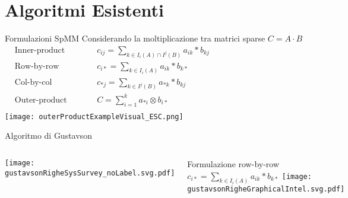 \section{Algoritmi Esistenti}
\begin{frame} {Formulazioni SpMM}
Considerando la moltiplicazione tra matrici sparse $C = A\cdot B$
\voidLine
\centering
$
\begin{aligned}
  &\text{Inner-product}	&& \qquad c_{ij} = \sum\limits_{k \in I_i(A) \cap I^j(B) }  a_{ik} \ast  b_{kj}   \\
  &\text{Row-by-row}	&& \qquad c_{i*} = \sum\limits_{k \in I_i(A)}  a_{ik} \ast  b_{k*}  \\
  &\text{Col-by-col}	&& \qquad c_{*j} = \sum\limits_{k \in I^j(B)}  a_{*k} \ast  b_{kj}   \\
  &\text{Outer-product}	&& \qquad C = \sum\limits_{i=1}^k  a_{*i} \otimes  b_{i*}                \\
\end{aligned}
$\\
\texttt{[image: outerProductExampleVisual\_ESC.png]}

\end{frame}

\begin{frame} {Algoritmo di Gustavson}
\begin{columns}
	\texttt{[image: gustavsonRigheSysSurvey\_noLabel.svg.pdf]}
	
  	Formulazione row-by-row $c_{i*} = \sum\limits_{k \in I_i(A)}  a_{ik} \ast  b_{k*}$
	\voidLine
	\voidLine
	\texttt{[image: gustavsonRigheGraphicalIntel.svg.pdf]}
	
\end{columns}

\end{frame}


